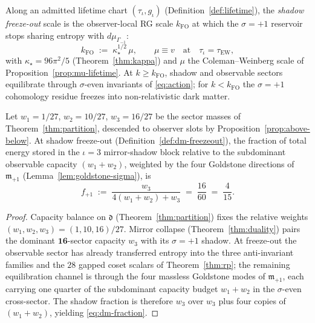 \begin{definition}\label{def:dm-freezeout}
Along an admitted lifetime chart $(\tau_\iota,g_\iota)$
(Definition~\ref{def:lifetime}), the \emph{shadow freeze-out} scale is the
observer-local RG scale $k_{\mathrm{FO}}$ at which the $\sigma=+1$ reservoir
stops sharing entropy with $d\mu_{\Gamma_{-1}}$:
\begin{equation}\label{eq:dm-freezeout}
  k_{\mathrm{FO}}
  \;:=\;
  \kappa_\star^{1/2}\,\mu,
  \qquad
  \mu\equiv v
  \quad\text{at}\quad
  \tau_\iota=\tau_{\mathrm{EW}},
\end{equation}
with $\kappa_\star=96\pi^2/5$ (Theorem~\ref{thm:kappa}) and $\mu$ the
Coleman--Weinberg scale of Proposition~\ref{prop:mu-lifetime}. At
$k\geq k_{\mathrm{FO}}$, shadow and observable sectors equilibrate through
$\sigma$-even invariants of \eqref{eq:action}; for $k<k_{\mathrm{FO}}$ the
$\sigma=+1$ cohomology residue freezes into non-relativistic dark matter.
\end{definition}

\begin{lemma}
\label{lem:dm-capacity-fraction}
Let $w_1=1/27$, $w_2=10/27$, $w_3=16/27$ be the sector masses of
Theorem~\ref{thm:partition}, descended to observer slots by
Proposition~\ref{prop:above-below}. At shadow freeze-out
(Definition~\ref{def:dm-freezeout}), the fraction of total energy stored in the
$\iota=3$ mirror-shadow block relative to the subdominant observable capacity
$(w_1+w_2)$, weighted by the four Goldstone directions of
$\mathfrak{m}_{+1}$ (Lemma~\ref{lem:goldstone-sigma}), is
\begin{equation}\label{eq:dm-fraction}
  f_{+1}
  \;:=\;
  \frac{w_3}{4(w_1+w_2)+w_3}
  \;=\;
  \frac{16}{60}
  \;=\;
  \frac{4}{15}.
\end{equation}
\end{lemma}

\begin{proof}
Capacity balance on $\mathfrak{d}$ (Theorem~\ref{thm:partition}) fixes the
relative weights $(w_1,w_2,w_3)=(1,10,16)/27$. Mirror collapse
(Theorem~\ref{thm:duality}) pairs the dominant $\mathbf{16}$-sector capacity
$w_3$ with its $\sigma=+1$ shadow. At freeze-out the observable sector has
already transferred entropy into the three anti-invariant families and the
$28$ gapped coset scalars of Theorem~\ref{thm:rp}; the remaining
equilibration channel is through the four massless Goldstone modes of
$\mathfrak{m}_{+1}$, each carrying one quarter of the subdominant capacity
budget $w_1+w_2$ in the $\sigma$-even cross-sector. The shadow fraction is
therefore $w_3$ over $w_3$ plus four copies of $(w_1+w_2)$, yielding
\eqref{eq:dm-fraction}.
\end{proof}

